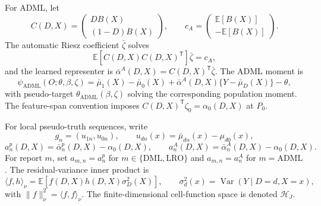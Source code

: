 \documentclass[11pt]{article}
\newcommand{\E}{\mathbb{E}}
\newcommand{\transpose}{\mathsf{T}}
\theoremstyle{definition}
\theoremstyle{plain}
\theoremstyle{remark}
\begin{document}
For ADML, let
\[
C(D,X)=\begin{pmatrix}D B(X)\\ (1-D)B(X)\end{pmatrix},
\qquad c_A=\begin{pmatrix}\E[B(X)]\\ -\E[B(X)]\end{pmatrix}.
\]
The automatic Riesz coefficient \(\bar\zeta\) solves
\[
\E[C(D,X)C(D,X)^\transpose]\bar\zeta=c_A,
\]
and the learned representer is \(\bar\alpha^A(D,X)=C(D,X)^\transpose\bar\zeta\).  The ADML moment is
\[
\psi_{\mathrm{ADML}}(O;\theta,\beta,\zeta)=
\bar\mu_1(X)-\bar\mu_0(X)+\bar\alpha^A(D,X)\{Y-\bar\mu_D(X)\}-\theta,
\]
with pseudo-target \(\theta_{\mathrm{ADML}}(\beta,\zeta)\) solving the corresponding population moment.  The feature-span convention imposes \(C(D,X)^\transpose\zeta_0=\alpha_0(D,X)\) at \(P_0\).

For local pseudo-truth sequences, write
\[
g_n=(u_{1n},u_{0n}),\qquad u_{dn}(x)=\bar\mu_{dn}(x)-\mu_{d0}(x),
\]
\[
a^p_n(D,X)=\bar\alpha^p_n(D,X)-\alpha_0(D,X),\qquad
a^A_n(D,X)=\bar\alpha^A_n(D,X)-\alpha_0(D,X).
\]
For report \(m\), set \(a_{m,n}=a^p_n\) for \(m\in\{\mathrm{DML},\mathrm{LRO}\}\) and \(a_{m,n}=a^A_n\) for \(m=\mathrm{ADML}\).  The residual-variance inner product is
\[
\langle f,h\rangle_\nu=\E[f(D,X)h(D,X)\sigma_D^2(X)],
\qquad \sigma_d^2(x)=\operatorname{Var}(Y\mid D=d,X=x),
\]
with \(\|f\|_\nu^2=\langle f,f\rangle_\nu\).  The finite-dimensional cell-function space is denoted \(\mathcal H_J\).
\end{document}
